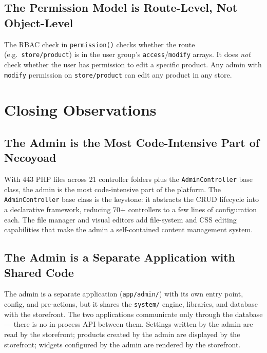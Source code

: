 \documentclass[11pt,a4paper]{article}
\begin{document}
\subsection{The Permission Model is Route-Level, Not Object-Level}

The RBAC check in \texttt{permission()} checks whether the route
(e.g.\ \texttt{store/product}) is in the user group's
\texttt{access}/\texttt{modify} arrays. It does \emph{not} check
whether the user has permission to edit a specific product. Any admin
with \texttt{modify} permission on \texttt{store/product} can edit
any product in any store.

\section{Closing Observations}\label{sec:observations}

\subsection{The Admin is the Most Code-Intensive Part of Necoyoad}

With 443 PHP files across 21 controller folders plus the \texttt{AdminController} base
class, the admin is the most
code-intensive part of the platform. The \texttt{AdminController} base
class is the keystone: it abstracts the CRUD lifecycle into a
declarative framework, reducing 70+ controllers to a few lines of
configuration each. The file manager and visual editors add
file-system and CSS editing capabilities that make the admin a
self-contained content management system.

\subsection{The Admin is a Separate Application with Shared Code}

The admin is a separate application (\texttt{app/admin/}) with its own
entry point, config, and pre-actions, but it shares the
\texttt{system/} engine, libraries, and database with the storefront.
The two applications communicate only through the database --- there
is no in-process API between them. Settings written by the admin are
read by the storefront; products created by the admin are displayed by
the storefront; widgets configured by the admin are rendered by the
storefront.
\end{document}
